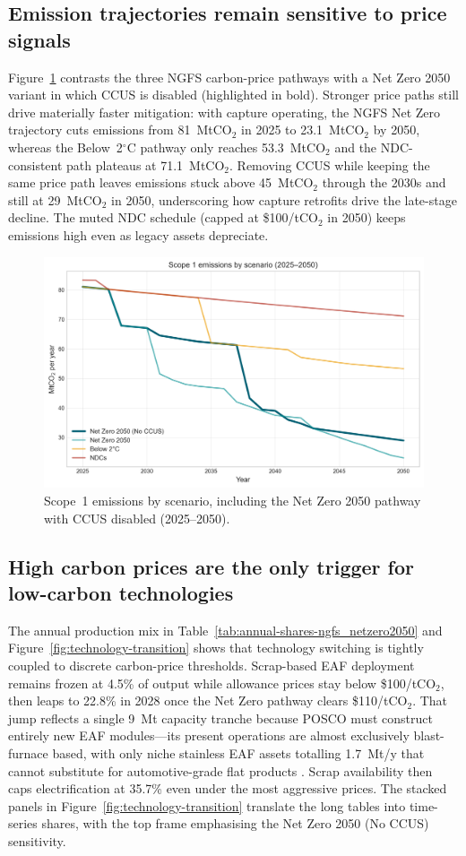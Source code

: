 \documentclass[preprint,1p,authoryear]{elsarticle}
\begin{document}
\subsection{Emission trajectories remain sensitive to price signals}

Figure~\ref{fig:scope1-by-scenario} contrasts the three NGFS carbon-price pathways with a Net Zero 2050 variant in which CCUS is disabled (highlighted in bold). Stronger price paths still drive materially faster mitigation: with capture operating, the NGFS Net Zero trajectory cuts emissions from 81~MtCO$_2$ in 2025 to 23.1~MtCO$_2$ by 2050, whereas the Below~2$^\circ$C pathway only reaches 53.3~MtCO$_2$ and the NDC-consistent path plateaus at 71.1~MtCO$_2$. Removing CCUS while keeping the same price path leaves emissions stuck above 45~MtCO$_2$ through the 2030s and still at 29~MtCO$_2$ in 2050, underscoring how capture retrofits drive the late-stage decline. The muted NDC schedule (capped at \$100/tCO$_2$ in 2050) keeps emissions high even as legacy assets depreciate.

\begin{figure}[!t]
  \centering
  \includegraphics[width=0.8\linewidth]{scope1_by_scenario}
  \caption{Scope~1 emissions by scenario, including the Net Zero 2050 pathway with CCUS disabled (2025--2050).}
  \label{fig:scope1-by-scenario}
\end{figure}

\subsection{High carbon prices are the only trigger for low-carbon technologies}

The annual production mix in Table~\ref{tab:annual-shares-ngfs_netzero2050} and Figure~\ref{fig:technology-transition} shows that technology switching is tightly coupled to discrete carbon-price thresholds. Scrap-based EAF deployment remains frozen at 4.5\% of output while allowance prices stay below \$100/tCO$_2$, then leaps to 22.8\% in 2028 once the Net Zero pathway clears \$110/tCO$_2$. That jump reflects a single 9~Mt capacity tranche because POSCO must construct entirely new EAF modules—its present operations are almost exclusively blast-furnace based, with only niche stainless EAF assets totalling 1.7~Mt/y that cannot substitute for automotive-grade flat products \citep{POSCO2023SR}. Scrap availability then caps electrification at 35.7\% even under the most aggressive prices. The stacked panels in Figure~\ref{fig:technology-transition} translate the long tables into time-series shares, with the top frame emphasising the Net Zero 2050 (No CCUS) sensitivity.
\end{document}
